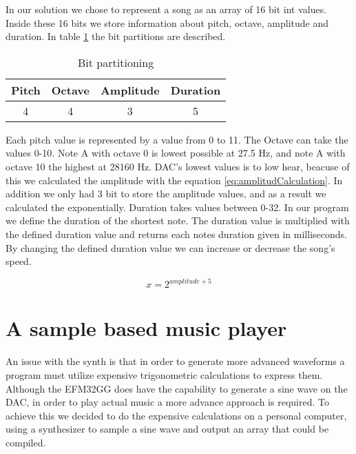 In our solution we chose to represent a song as an array of 16 bit int values. Inside these 16 bits we store information about pitch, octave, amplitude and duration. In table \ref{tab:bitFields} the bit partitions are described. \\

\begin{table}[ht]
	\begin{center}
	\begin{tabular}{ |c|c|c|c| }
	  \hline
	  Pitch & Octave & Amplitude & Duration \\
	  \hline
	  4 & 4 & 3 & 5 \\
	  \hline

	\end{tabular}
	\caption{Bit partitioning}
	\label{tab:bitFields}
	\end{center}
\end{table}

Each pitch value is represented by a value from 0 to 11. The Octave can take the values 0-10. Note A with octave 0 is lowest possible at 27.5 Hz, and note A with octave 10 the highest at 28160 Hz. DAC's lowest values is to low hear, beacuse of this we calculated the amplitude with the equation \ref{eq:amplitudCalculation}. In addition we only had 3 bit to store the amplitude values, and as a result we calculated the exponentially. Duration takes values between 0-32. In our program we define the duration of the shortest note. The duration value is multiplied with the defined duration value and returns each notes duration given in milliseconds. By changing the defined duration value we can increase or decrease the song's speed.

\begin{equation}
  x = 2^{amplitude + 5}
  \label{eq:amplitudCalculation}
\end{equation}


\section{A sample based music player}

An issue with the synth is that in order to generate more advanced waveforms a program must utilize expensive trigonometric calculations to express them. Although the EFM32GG does have the capability to generate a sine wave on the DAC, in order to play actual music a more advance approach is required. To achieve this we decided to do the expensive calculations on a personal computer, using a synthesizer to sample a sine wave and output an array that could be compiled. 

